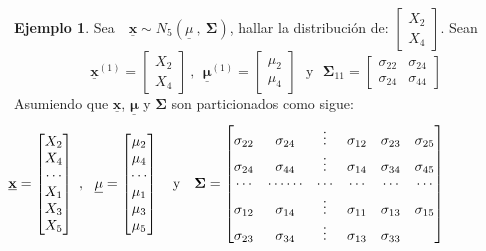 \documentclass[
]{book}
\theoremstyle{definition}
\theoremstyle{definition}
\newtheorem{example}{Ejemplo}[chapter]
\theoremstyle{definition}
\theoremstyle{definition}
\theoremstyle{remark}
\begin{document}
\begin{example}
\protect\hypertarget{exm:ejemplo1-prop-4}{}\label{exm:ejemplo1-prop-4}Sea~~\(\underline{\mathbf{x}}\sim N_5 (\underline{\mu} \ , \ \mathbf{\Sigma})\), hallar la distribución de:
\(\begin{bmatrix}X_2 \\ X_4 \end{bmatrix}\).
Sean
\[
\underline{\mathbf{x}}^{(1)}=\begin{bmatrix}
X_2 \\ X_4
\end{bmatrix}\ , \ \ \underline{\mathbf{\mu}}^{(1)}=\begin{bmatrix}
\mu_2 \\ \mu_4 
\end{bmatrix}\ \ \ \text{y} \ \ \ \mathbf{\Sigma}_{11}=\begin{bmatrix}
\sigma_{22} & \sigma_{24}\\
\sigma_{24} & \sigma_{44}
\end{bmatrix}
\]
Asumiendo que \(\underline{\mathbf{x}}\), \(\underline{\mathbf{\mu}}\) y \(\mathbf{\Sigma}\) son particionados como sigue:
\[
\hspace{-2.0cm}\underline{\mathbf{x}}=\begin{bmatrix}
X_2 \\ X_4 \\ \cdots \\ X_1 \\ X_3 \\ X_5
\end{bmatrix}\ , \ \ \underline{\mathbf{\mu}}=\begin{bmatrix}
\mu_2 \\ \mu_4 \\ \cdots \\ \mu_1 \\ \mu_3 \\ \mu_5
\end{bmatrix}\ \ \ \text{y} \ \ \ \mathbf{\Sigma}=\begin{bmatrix}
\sigma_{22} & \sigma_{24} & \vdots & \sigma_{12} & \sigma_{23} & \sigma_{25}\\
\sigma_{24} & \sigma_{44}& \vdots & \sigma_{14} & \sigma_{34} & \sigma_{45}\\
\cdots & \cdots \cdots & \cdots & \cdots & \cdots & \cdots\\
\sigma_{12} &\sigma_{14} & \vdots & \sigma_{11} &\sigma_{13}
&\sigma_{15}  \\
\sigma_{23} &\sigma_{34} & \vdots & \sigma_{13} &\sigma_{33}

\end{bmatrix}\]
\end{example}
\end{document}
